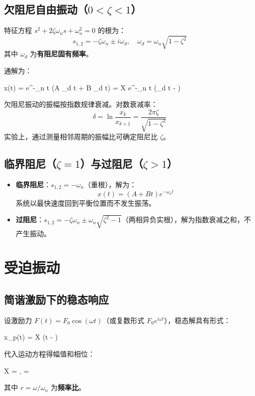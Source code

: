 \subsection{欠阻尼自由振动（$0 < \zeta < 1$）}

特征方程 $s^2 + 2\zeta\omega_n s + \omega_n^2 = 0$ 的根为：
\[
s_{1,2} = -\zeta \omega_n \pm i \omega_d, \quad \omega_d = \omega_n \sqrt{1 - \zeta^2}
\]
其中 $\omega_d$ 为\textbf{有阻尼固有频率}。

通解为：
\begin{myformula}
	x(t) = e^{-\zeta \omega_n t} (A \cos \omega_d t + B \sin \omega_d t) = X e^{-\zeta \omega_n t} \cos(\omega_d t - \varphi)
\end{myformula}

\begin{remark}
	欠阻尼振动的振幅按指数规律衰减。对数衰减率：
	\[
	\delta = \ln \frac{x_k}{x_{k+1}} = \frac{2\pi \zeta}{\sqrt{1 - \zeta^2}}
	\]
	实验上，通过测量相邻周期的振幅比可确定阻尼比 $\zeta$。
\end{remark}

\subsection{临界阻尼（$\zeta = 1$）与过阻尼（$\zeta > 1$）}

\begin{itemize}
	\item \textbf{临界阻尼}：$s_{1,2} = -\omega_n$（重根），解为：
	\[
	x(t) = (A + Bt) e^{-\omega_n t}
	\]
	系统以最快速度回到平衡位置而不发生振荡。
	\item \textbf{过阻尼}：$s_{1,2} = -\zeta \omega_n \pm \omega_n \sqrt{\zeta^2 - 1}$（两相异负实根），解为指数衰减之和，不产生振动。
\end{itemize}

\section{受迫振动}

\subsection{简谐激励下的稳态响应}

设激励力 $F(t) = F_0 \cos(\omega t)$（或复数形式 $F_0 e^{i\omega t}$），稳态解具有形式：
\begin{myformula}
	x_p(t) = X \cos(\omega t - \theta)
\end{myformula}
代入运动方程得幅值和相位：
\begin{myformula}
	X = , \qquad
	\theta = \arctan {}
\end{myformula}
其中 $r = \omega/\omega_n$ 为\textbf{频率比}。

